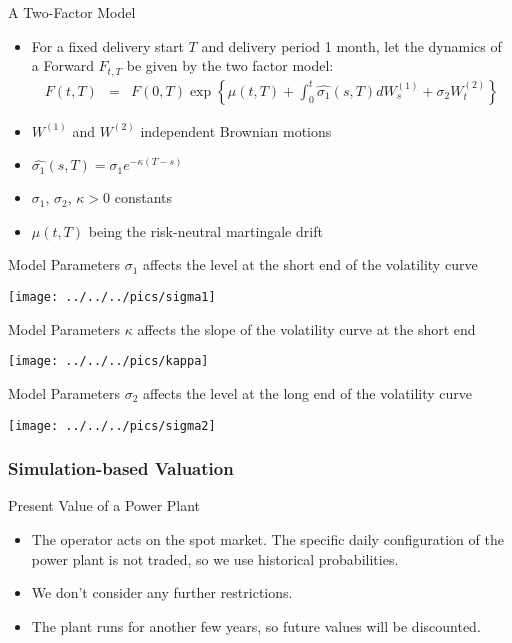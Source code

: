 {A Two-Factor Model}
\begin{itemize}
\item<1-> For a fixed delivery start $T$ and delivery period 1 month, let the dynamics of a Forward $F_{t,T}$ be given by the two factor model:
\begin{eqnarray*}
F(t,T)& =&F(0,T)\exp\left\{\mu(t,T)  +\int_0^t\hat{\sigma_1}(s,T)dW_s^{(1)}+\sigma_2W_t^{(2)}\right\}
\end{eqnarray*}

\item<2-> $W^{(1)}$ and $W^{(2)}$ independent Brownian motions
\item<3-> $\hat{\sigma_1}(s,T)=\sigma_1e^{-\kappa(T-s)}$
\item<4-> $\sigma_1$, $\sigma_2$, $\kappa>0$ constants
\item<5-> $\mu(t,T)$ being the risk-neutral martingale drift
\end{itemize}



{Model Parameters}
$\sigma_1$ affects the level at the short end of the volatility curve

\begin{center}
\texttt{[image: ../../../pics/sigma1]}
\end{center}




{Model Parameters}
$\kappa$ affects the slope of the volatility curve at the short end

\begin{center}
\texttt{[image: ../../../pics/kappa]}
\end{center}




{Model Parameters}
$\sigma_2$ affects the level at the long end of the volatility curve

\begin{center}
\texttt{[image: ../../../pics/sigma2]}
\end{center}



\subsubsection{Simulation-based Valuation}


{Present Value of a Power Plant}
\begin{itemize}
\item<1-> The operator acts on the spot market. The specific daily configuration of the power plant is not traded, so we use historical probabilities.
\item<2-> We don't consider any further restrictions.
\item<3-> The plant runs for another few years, so future values will be discounted.
\end{itemize}





